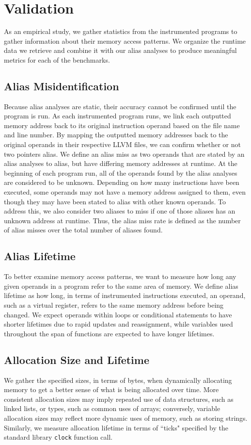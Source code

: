 \chapter{Validation}

As an empirical study, we gather statistics from the instrumented programs to gather information about their memory access patterns. We organize the runtime data we retrieve and combine it with our alias analyses to produce meaningful metrics for each of the benchmarks.

\section{Alias Misidentification}
Because alias analyses are static, their accuracy cannot be confirmed until the program is run. As each instrumented program runs, we link each outputted memory address back to its original instruction operand based on the file name and line number. By mapping the outputted memory addresses back to the original operands in their respective LLVM files, we can confirm whether or not two pointers alias. We define an alias miss as two operands that are stated by an alias analyses to alias, but have differing memory addresses at runtime. At the beginning of each program run, all of the operands found by the alias analyses are considered to be unknown. Depending on how many instructions have been executed, some operands may not have a memory address assigned to them, even though they may have been stated to alias with other known operands. To address this, we also consider two aliases to miss if one of those aliases has an unknown address at runtime. Thus, the alias miss rate is defined as the number of alias misses over the total number of aliases found.

\section{Alias Lifetime}
To better examine memory access patterns, we want to measure how long any given operands in a program refer to the same area of memory. We define alias lifetime as how long, in terms of instrumented instructions executed, an operand, such as a virtual register, refers to the same memory address before being changed. We expect operands within loops or conditional statements to have shorter lifetimes due to rapid updates and reassignment, while variables used throughout the span of functions are expected to have longer lifetimes.

\section{Allocation Size and Lifetime}
We gather the specified sizes, in terms of bytes, when dynamically allocating memory to get a better sense of what is being allocated over time. More consistent allocation sizes may imply repeated use of data structures, such as linked lists, or types, such as common uses of arrays; conversely, variable allocation sizes may reflect more dynamic uses of memory, such as storing strings. Similarly, we measure allocation lifetime in terms of ``ticks" specified by the standard library \texttt{clock} function call.
